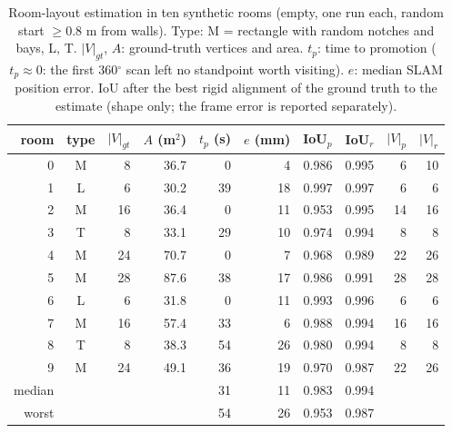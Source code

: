 \begin{table}[t]
\centering
\caption{Room-layout estimation in ten synthetic rooms (empty, one run each, random start $\geq$0.8 m from walls). Type: M = rectangle with random notches and bays, L, T. $|V|_{gt}$, $A$: ground-truth vertices and area. $t_p$: time to promotion ($t_p\approx0$: the first 360$^\circ$ scan left no standpoint worth visiting). $e$: median SLAM position error. IoU after the best rigid alignment of the ground truth to the estimate (shape only; the frame error is reported separately).}
\label{tab:estimation-synthetic}
\begin{tabular}{r c r r r r r r r r}
\toprule
room & type & $|V|_{gt}$ & $A$ (m$^2$) & $t_p$ (s) & $e$ (mm) & IoU$_p$ & IoU$_r$ & $|V|_p$ & $|V|_r$ \\
\midrule
0 & M & 8 & 36.7 & 0 & 4 & 0.986 & 0.995 & 6 & 10 \\
1 & L & 6 & 30.2 & 39 & 18 & 0.997 & 0.997 & 6 & 6 \\
2 & M & 16 & 36.4 & 0 & 11 & 0.953 & 0.995 & 14 & 16 \\
3 & T & 8 & 33.1 & 29 & 10 & 0.974 & 0.994 & 8 & 8 \\
4 & M & 24 & 70.7 & 0 & 7 & 0.968 & 0.989 & 22 & 26 \\
5 & M & 28 & 87.6 & 38 & 17 & 0.986 & 0.991 & 28 & 28 \\
6 & L & 6 & 31.8 & 0 & 11 & 0.993 & 0.996 & 6 & 6 \\
7 & M & 16 & 57.4 & 33 & 6 & 0.988 & 0.994 & 16 & 16 \\
8 & T & 8 & 38.3 & 54 & 26 & 0.980 & 0.994 & 8 & 8 \\
9 & M & 24 & 49.1 & 36 & 19 & 0.970 & 0.987 & 22 & 26 \\
\midrule
median & & & & 31 & 11 & 0.983 & 0.994 & & \\
worst & & & & 54 & 26 & 0.953 & 0.987 & & \\
\bottomrule
\end{tabular}
\end{table}
